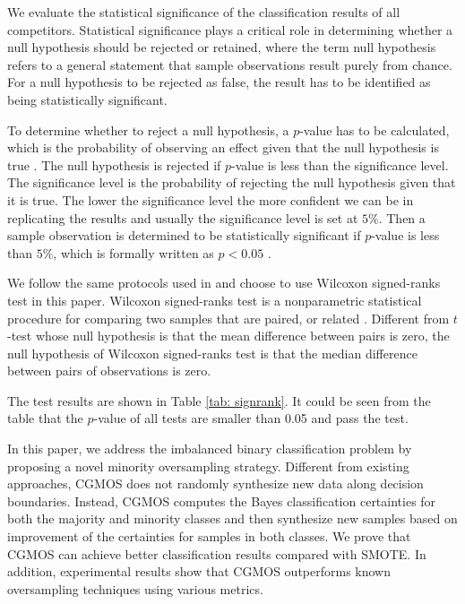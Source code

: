 \documentclass{iitthesis}
\begin{document}
 We evaluate the statistical significance of the classification results of all competitors. Statistical significance plays a critical role in determining whether a null hypothesis should be rejected or retained, where the term null hypothesis refers to a general statement that sample observations result purely from chance. For a null hypothesis to be rejected as false, the result has to be identified as being statistically significant.

To determine whether to reject a null hypothesis, a $p$-value has to be calculated, which is the probability of observing an effect given that the null hypothesis is true \cite{JLD:11}. The null hypothesis is rejected if $p$-value is less than the significance level. The significance level is the probability of rejecting the null hypothesis given that it is true. The lower the significance level the more confident we can be in replicating the results and usually the significance level is set at $5\%$. Then a sample observation is determined to be statistically significant if $p$-value is less than $5\%$, which is formally written as $p<0.05$ \cite{SM:06}.

We follow the same protocols used in \cite{demvsar2006statistical}\cite{chen2010ramoboost}\cite{barua2014mwmote} and choose to use Wilcoxon signed-ranks test in this paper. Wilcoxon signed-ranks test is a nonparametric statistical procedure for comparing two samples that are paired, or related \cite{GC09}. Different from $t$-test \cite{BF:08}\cite{zimmerman1997teacher}\cite{demvsar2006statistical} whose null hypothesis is that the mean difference between pairs is zero, the null hypothesis of Wilcoxon signed-ranks test is that the median difference between pairs of observations is zero.

The test results are shown in Table \ref{tab: signrank}. It could be seen from the table that the $p$-value of all tests are smaller than 0.05 and pass the test. 

In this paper, we address the imbalanced binary classification problem by proposing a novel minority oversampling strategy. Different from existing approaches, CGMOS does not randomly synthesize new data along decision boundaries. Instead, CGMOS computes the Bayes classification certainties for both the majority and minority classes and then synthesize new samples based on improvement of the certainties for samples in both classes. We prove that CGMOS can achieve better classification results compared with SMOTE. In addition, experimental results show that CGMOS outperforms known oversampling techniques using various metrics.
\end{document}
